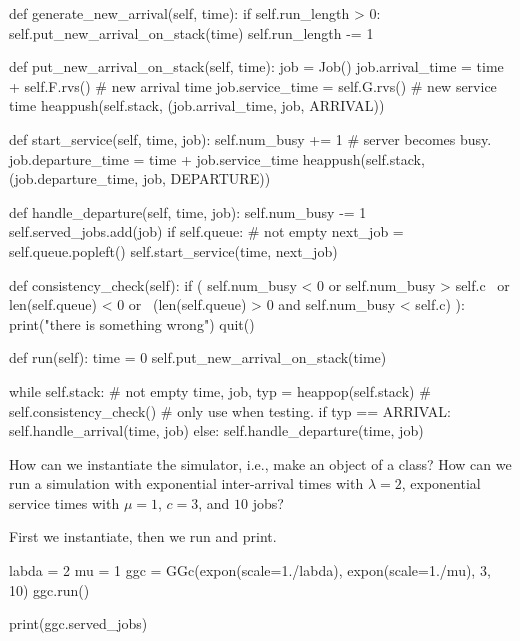 \begin{exercise}
\begin{solution}
\begin{pyblock}
    def generate_new_arrival(self, time):
        if self.run_length > 0:
            self.put_new_arrival_on_stack(time)
            self.run_length -= 1

    def put_new_arrival_on_stack(self, time):
        job = Job()
        job.arrival_time = time + self.F.rvs()  # new arrival time
        job.service_time = self.G.rvs()  # new service time
        heappush(self.stack, (job.arrival_time, job, ARRIVAL))

    def start_service(self, time, job):
        self.num_busy += 1  # server becomes busy.
        job.departure_time = time + job.service_time
        heappush(self.stack, (job.departure_time, job, DEPARTURE))

    def handle_departure(self, time, job):
        self.num_busy -= 1
        self.served_jobs.add(job)
        if self.queue:  # not empty
            next_job = self.queue.popleft()
            self.start_service(time, next_job)

    def consistency_check(self):
        if ( self.num_busy < 0 or self.num_busy > self.c \
            or len(self.queue) < 0 or \
            (len(self.queue) > 0 and self.num_busy < self.c) ):
            print("there is something wrong")
            quit()

    def run(self):
        time = 0
        self.put_new_arrival_on_stack(time)

        while self.stack:  # not empty
            time, job, typ = heappop(self.stack)
            # self.consistency_check() # only use when testing.
            if typ == ARRIVAL:
                self.handle_arrival(time, job)
            else:
                self.handle_departure(time, job)


\end{pyblock}
\end{solution}
  
\end{exercise}

      

\begin{exercise}

How can we instantiate the  simulator, i.e., make an object of a class? How can we run a simulation with exponential inter-arrival times with $\lambda=2$, exponential service times with $\mu=1$, $c=3$, and $10$ jobs?
\begin{solution}
First we instantiate, then we run and print. 
\begin{pyblock}
labda = 2
mu = 1  
ggc = GGc(expon(scale=1./labda), expon(scale=1./mu), 3, 10)
ggc.run()

print(ggc.served_jobs)
\end{pyblock}
\end{solution}
\end{exercise}

